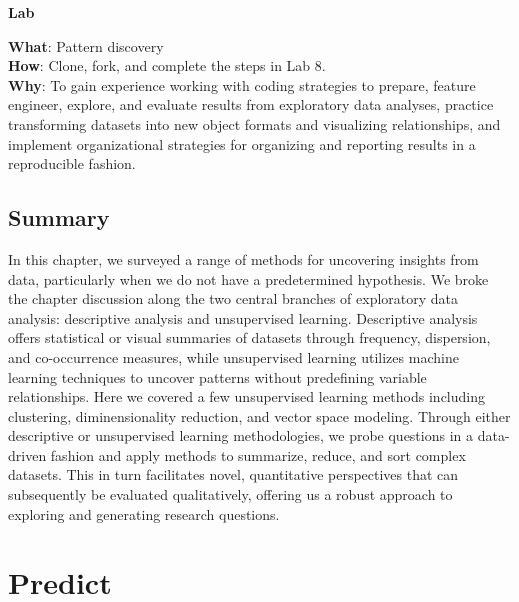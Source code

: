 \documentclass[
  letterpaper,
  krantz1]{latex/krantz-mod}
\theoremstyle{definition}
\theoremstyle{definition}
\theoremstyle{remark}
\begin{document}
\begin{tcolorbox}[enhanced jigsaw, leftrule=.75mm, colframe=quarto-callout-color-frame, left=2mm, colback=white, toprule=.15mm, breakable, arc=.35mm, opacityback=0, bottomrule=.15mm, rightrule=.15mm]

\textbf{ Lab}

\textbf{What}: Pattern discovery\\
\textbf{How}: Clone, fork, and complete the steps in Lab 8.\\
\textbf{Why}: To gain experience working with coding strategies to
prepare, feature engineer, explore, and evaluate results from
exploratory data analyses, practice transforming datasets into new
object formats and visualizing relationships, and implement
organizational strategies for organizing and reporting results in a
reproducible fashion.

\end{tcolorbox}

\section*{Summary}\label{summary-7}


In this chapter, we surveyed a range of methods for uncovering insights
from data, particularly when we do not have a predetermined hypothesis.
We broke the chapter discussion along the two central branches of
exploratory data analysis: descriptive analysis and unsupervised
learning. Descriptive analysis offers statistical or visual summaries of
datasets through frequency, dispersion, and co-occurrence measures,
while unsupervised learning utilizes machine learning techniques to
uncover patterns without predefining variable relationships. Here we
covered a few unsupervised learning methods including clustering,
diminensionality reduction, and vector space modeling. Through either
descriptive or unsupervised learning methodologies, we probe questions
in a data-driven fashion and apply methods to summarize, reduce, and
sort complex datasets. This in turn facilitates novel, quantitative
perspectives that can subsequently be evaluated qualitatively, offering
us a robust approach to exploring and generating research questions.

\chapter{Predict}\label{sec-predict-chapter}
\end{document}
